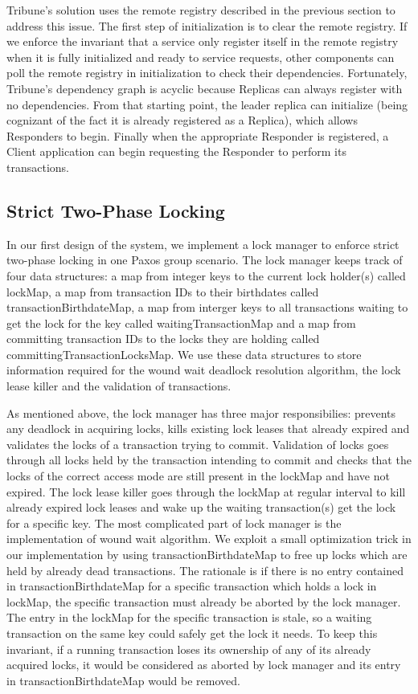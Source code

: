 \documentclass[10pt,twocolumn]{article}
\begin{document}
Tribune's solution uses the remote registry described in the previous section to address this issue. The first step of initialization is to clear the remote registry. If we enforce the invariant that a service only register itself in the remote registry when it is fully initialized and ready to service requests, other components can poll the remote registry in initialization to check their dependencies. Fortunately, Tribune's dependency graph is acyclic because Replicas can always register with no dependencies. From that starting point, the leader replica can initialize (being cognizant of the fact it is already registered as a Replica), which allows Responders to begin. Finally when the appropriate Responder is registered, a Client application can begin requesting the Responder to perform its transactions.

\subsection{Strict Two-Phase Locking}
In our first design of the system, we implement a lock manager to enforce strict two-phase locking in one Paxos group scenario. The lock manager keeps track of four data structures: a map from integer keys to the current lock holder(s) called lockMap, a map from transaction IDs to their birthdates called transactionBirthdateMap, a map from interger keys to all transactions waiting to get the lock for the key called waitingTransactionMap and a map from committing transaction IDs to the locks they are holding called committingTransactionLocksMap. We use these data structures to store information required for the wound wait deadlock resolution algorithm,  the lock lease killer and the validation of transactions. 

As mentioned above, the lock manager has three major responsibilies: prevents any deadlock in acquiring locks, kills existing lock leases that already expired and validates the locks of a transaction trying to commit. Validation of locks goes through all locks held by the transaction intending to commit and checks that the locks of the correct access mode are still present in the lockMap and have not expired. The lock lease killer goes through the lockMap at regular interval to kill already expired lock leases and wake up the waiting transaction(s) get the lock for a specific key. The most complicated part  of lock manager is the implementation of wound wait algorithm. We exploit a small optimization trick in our implementation by using transactionBirthdateMap to free up locks which are held by already dead transactions. The rationale is if there is no entry contained in transactionBirthdateMap for a specific transaction which holds a lock in lockMap, the specific transaction must already be aborted by the lock manager. The entry in the lockMap for the specific transaction is stale, so a waiting transaction on the same key could safely get the lock it needs. To keep this invariant, if a running transaction loses its ownership of any of its already acquired locks, it would be considered as aborted by lock manager and its entry in transactionBirthdateMap would be removed.
\end{document}
